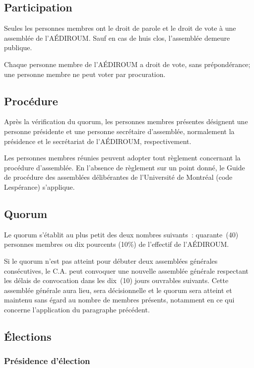 \documentclass{aediroum}
\begin{document}
\subsection{Participation}\label{sec:participation}

Seules les personnes membres ont le droit de parole et le droit de vote à une assemblée de l'AÉDIROUM. Sauf en cas de huis clos, l'assemblée demeure publique.

Chaque personne membre de l'AÉDIROUM a droit de vote, sans prépondérance; une personne membre ne peut voter par procuration.

\subsection{Procédure}\label{sec:procedure-generale}

Après la vérification du quorum, les personnes membres présentes désignent une personne présidente et une personne secrétaire d'assemblée, normalement la présidence et le secrétariat de l'AÉDIROUM, respectivement.

Les personnes membres réunies peuvent adopter tout règlement concernant la procédure d'assemblée. En l'absence de règlement sur un point donné, le Guide de procédure des assemblées délibérantes de l'Université de Montréal (code Lespérance) s'applique.

\subsection{Quorum}\label{sec:quorum}

Le quorum s'établit au plus petit des deux nombres suivants~: quarante~(40) personnes membres ou dix pourcents (10\%) de l'effectif de l'AÉDIROUM.

Si le quorum n'est pas atteint pour débuter deux assemblées générales consécutives, le C.A. peut convoquer une nouvelle assemblée générale respectant les délais de convocation dans les dix~(10) jours ouvrables suivants. Cette assemblée générale aura lieu, sera décisionnelle et le quorum sera atteint et maintenu sans égard au nombre de membres présents, notamment en ce qui concerne l'application du paragraphe précédent.

\subsection{Élections}\label{sec:elections}

\subsubsection{Présidence d'élection}\label{sec:president-delection}
\end{document}
